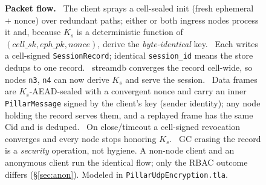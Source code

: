 \documentclass[10pt,twocolumn]{article}
\newcommand{\code}[1]{\texttt{\small #1}}
\newcommand{\Ks}{\ensuremath{K_s}}
\begin{document}
\begin{figure}[t]
\caption{\textbf{Packet flow.} ~The client sprays a cell-sealed init
(fresh ephemeral $+$ nonce) over redundant paths; either or both ingress nodes
process it and, because \Ks{} is a deterministic function of
$(\mathit{cell\_sk},\mathit{eph\_pk},\mathit{nonce})$, derive the
\emph{byte-identical} key. ~Each writes a cell-signed
\code{SessionRecord}; identical \code{session\_id} means the store dedups to one
record. ~streamdb converges the record cell-wide, so nodes \code{n3},
\code{n4} can now derive \Ks{} and serve the session. ~Data frames are
\Ks{}-AEAD-sealed with a convergent nonce and carry an inner \code{PillarMessage}
signed by the client's key (sender identity); any node holding the record serves
them, and a replayed frame has the same Cid and is deduped. ~On
close/timeout a cell-signed revocation converges and every node stops honoring
\Ks{}. ~GC erasing the record is a \emph{security} operation, not
hygiene. A non-node client and an anonymous client run the identical flow; only
the RBAC outcome differs (\S\ref{sec:anon}). Modeled in
\code{PillarUdpEncryption.tla}.}
\label{fig:flow}
\end{figure}
\end{document}
